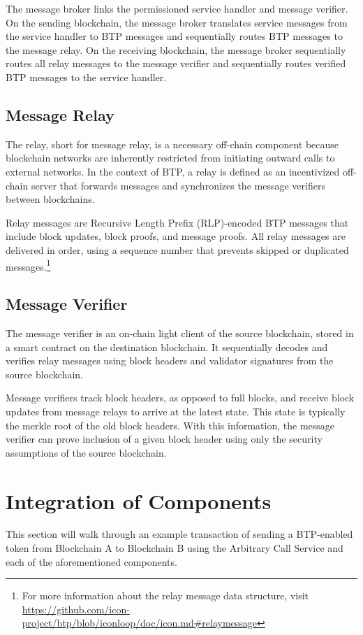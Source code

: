 \documentclass{article}
\begin{document}
The message broker links the permissioned service handler and message verifier. On the sending blockchain, the message broker translates service messages from the service handler to BTP messages and sequentially routes BTP messages to the message relay. On the receiving blockchain, the message broker sequentially routes all relay messages to the message verifier and sequentially routes verified BTP messages to the service handler.

\subsection{Message Relay}
\label{relay}
The relay, short for message relay, is a necessary off-chain component because blockchain networks are inherently restricted from initiating outward calls to external networks. In the context of BTP, a relay is defined as an incentivized off-chain server that forwards messages and synchronizes the message verifiers between blockchains.

Relay messages are Recursive Length Prefix (RLP)-encoded BTP messages that include block updates, block proofs, and message proofs.\cite{rlp} All relay messages are delivered in order, using a sequence number that prevents skipped or duplicated messages.\footnote{For more information about the relay message data structure, visit \url{https://github.com/icon-project/btp/blob/iconloop/doc/icon.md\#relaymessage}}

\subsection{Message Verifier}

The message verifier is an on-chain light client of the source blockchain, stored in a smart contract on the destination blockchain. It sequentially decodes and verifies relay messages using block headers and validator signatures from the source blockchain.

Message verifiers track block headers, as opposed to full blocks, and receive block updates from message relays to arrive at the latest state. This state is typically the merkle root of the old block headers. With this information, the message verifier can prove inclusion of a given block header using only the security assumptions of the source blockchain.

\section{Integration of Components}
This section will walk through an example transaction of sending a BTP-enabled token from Blockchain A to Blockchain B using the Arbitrary Call Service and each of the aforementioned components.
\end{document}
